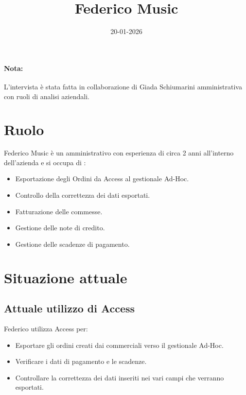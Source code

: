 \documentclass[12pt, a4paper]{article} %
\title{Federico Music}
\date{20-01-2026}
\begin{document}
\maketitle

\paragraph{Nota:}
L'intervista è stata fatta in collaborazione di Giada Schiumarini
amministrativa con ruoli di analisi aziendali.

\section{Ruolo}
Federico Music è un amministrativo con esperienza di circa 2 anni all'interno
dell'azienda e si occupa di :
\begin{itemize}
      \item Esportazione degli Ordini da Access al gestionale Ad-Hoc.
      \item Controllo della correttezza dei dati esportati.
      \item Fatturazione delle commesse.
      \item Gestione delle note di credito.
      \item Gestione delle scadenze di pagamento.
\end{itemize}

\section{Situazione attuale}

\subsection{Attuale utilizzo di Access}
Federico utilizza Access per:
\begin{itemize}
      \item Esportare gli ordini creati dai commerciali verso il gestionale Ad-Hoc.
      \item Verificare i dati di pagamento e le scadenze.
      \item Controllare la correttezza dei dati inseriti nei vari campi che verranno
            esportati.
\end{itemize}
\end{document}
